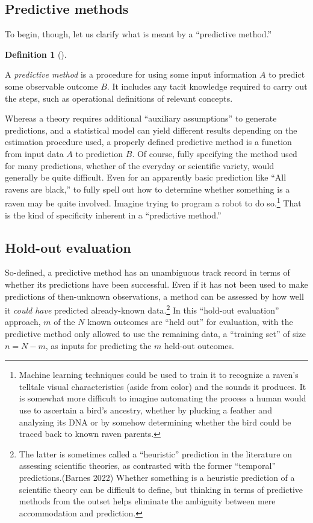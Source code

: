 \documentclass[
  letterpaper,
  DIV=11,
  numbers=noendperiod]{scrartcl}
\theoremstyle{definition}
\newtheorem{definition}{Definition}[section]
\theoremstyle{remark}
\begin{document}
\subsection{Predictive methods}\label{predictive-methods}

To begin, though, let us clarify what is meant by a ``predictive
method.''

\begin{definition}[]\protect\hypertarget{def-predictive}{}\label{def-predictive}

A \emph{predictive method} is a procedure for using some input
information \(A\) to predict some observable outcome \(B\). It includes
any tacit knowledge required to carry out the steps, such as operational
definitions of relevant concepts.

\end{definition}

Whereas a theory requires additional ``auxiliary assumptions'' to
generate predictions, and a statistical model can yield different
results depending on the estimation procedure used, a properly defined
predictive method is a function from input data \(A\) to prediction
\(B\). Of course, fully specifying the method used for many predictions,
whether of the everyday or scientific variety, would generally be quite
difficult. Even for an apparently basic prediction like ``All ravens are
black,'' to fully spell out how to determine whether something is a
raven may be quite involved. Imagine trying to program a robot to do
so.\footnote{Machine learning techniques could be used to train it to
  recognize a raven's telltale visual characteristics (aside from color)
  and the sounds it produces. It is somewhat more difficult to imagine
  automating the process a human would use to ascertain a bird's
  ancestry, whether by plucking a feather and analyzing its DNA or by
  somehow determining whether the bird could be traced back to known
  raven parents.} That is the kind of specificity inherent in a
``predictive method.''

\subsection{Hold-out evaluation}\label{hold-out-evaluation}

So-defined, a predictive method has an unambiguous track record in terms
of whether its predictions have been successful. Even if it has not been
used to make predictions of then-unknown observations, a method can be
assessed by how well it \emph{could have} predicted already-known
data.\footnote{The latter is sometimes called a ``heuristic'' prediction
  in the literature on assessing scientific theories, as contrasted with
  the former ``temporal'' predictions.(Barnes 2022) Whether something is
  a heuristic prediction of a scientific theory can be difficult to
  define, but thinking in terms of predictive methods from the outset
  helps eliminate the ambiguity between mere accommodation and
  prediction.} In this ``hold-out evaluation'' approach, \(m\) of the
\(N\) known outcomes are ``held out'' for evaluation, with the
predictive method only allowed to use the remaining data, a ``training
set'' of size \(n=N-m\), as inputs for predicting the \(m\) held-out
outcomes.
\end{document}
